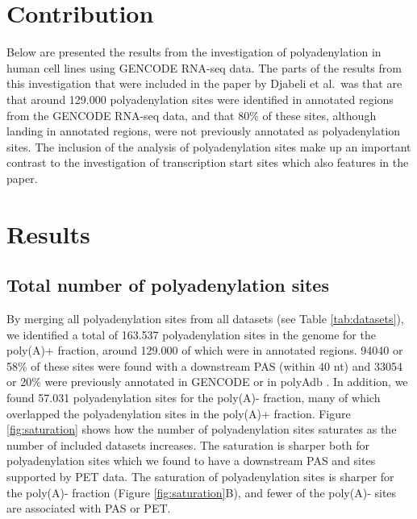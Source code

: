 \section{Contribution}
Below are presented the results from the investigation of polyadenylation in
human cell lines using GENCODE RNA-seq data. The parts of the results from this
investigation that were included in the paper by Djabeli et al.\ was that are
that around 129.000 polyadenylation sites were identified in annotated regions
from the GENCODE RNA-seq data, and that 80\% of these sites, although landing
in annotated regions, were not previously annotated as polyadenylation sites.
The inclusion of the analysis of polyadenylation sites make up an important
contrast to the investigation of transcription start sites which also features
in the paper.

\section{Results}

\subsection{Total number of polyadenylation sites}
By merging all polyadenylation sites from all datasets (see Table
\ref{tab:datasets}), we identified a total of 163.537 polyadenylation sites in
the genome for the poly(A)+ fraction, around 129.000 of which were in annotated
regions. 94040 or 58\% of these sites were found with a downstream PAS (within
40 nt) and 33054 or 20\% were previously annotated in GENCODE or in polyAdb
\cite{lee_polyadb_2007}. In addition, we found 57.031 polyadenylation sites for
the poly(A)- fraction, many of which overlapped the polyadenylation sites in
the poly(A)+ fraction. Figure \ref{fig:saturation} shows how the number of
polyadenylation sites saturates as the number of included datasets increases.
The saturation is sharper both for polyadenylation sites which we found to have
a downstream PAS and sites supported by PET data. The saturation of
polyadenylation sites is sharper for the poly(A)- fraction (Figure
\ref{fig:saturation}B), and fewer of the poly(A)- sites are associated with PAS
or PET.

